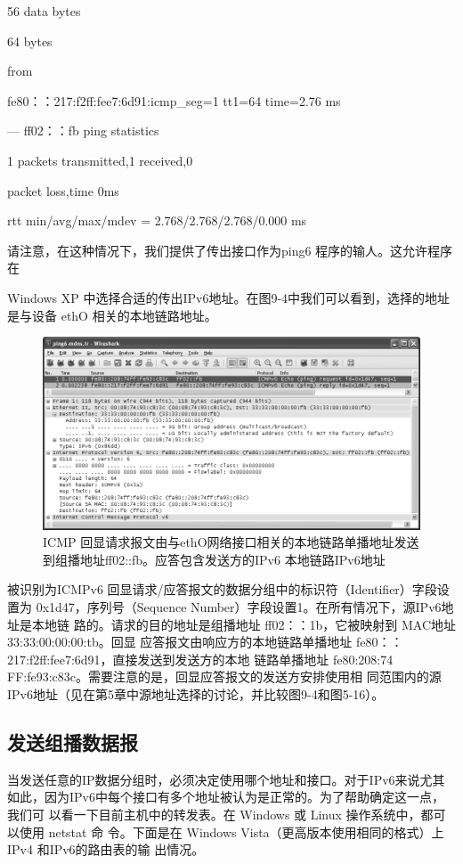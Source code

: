 56 data bytes

64 bytes

from

fe80：：217:f2ff:fee7:6d91:icmp\_seg=1 tt1=64 time=2.76 ms

--- ff02：：fb ping statistics

1 packets transmitted,1 received,0%

packet loss,time 0ms

rtt min/avg/max/mdev = 2.768/2.768/2.768/0.000 ms

请注意，在这种情况下，我们提供了传出接口作为ping6 程序的输人。这允许程序在

Windows XP 中选择合适的传出IPv6地址。在图9-4中我们可以看到，选择的地址是与设备
ethO 相关的本地链路地址。

\begin{figure}[ht]
    \centering
	\includegraphics[width=1\textwidth]{imgs/9/9-4.png}
	\caption{ICMP 回显请求报文由与ethO网络接口相关的本地链路单播地址发送到组播地址ff02::fb。应答包含发送方的IPv6 本地链路IPv6地址}
\end{figure}

被识别为ICMPv6 回显请求/应答报文的数据分组中的标识符（Identifier）字段设置为
0x1d47，序列号（Sequence Number）字段设置1。在所有情况下，源IPv6地址是本地链
路的。请求的目的地址是组播地址 ff02：：1b，它被映射到 MAC地址33:33:00:00:00:tb。回显
应答报文由响应方的本地链路单播地址 fe80：：217:f2ff:fee7:6d91，直接发送到发送方的本地
链路单播地址 fe80:208:74 FF:fe93:c83c。需要注意的是，回显应答报文的发送方安排使用相
同范围内的源 IPv6地址（见在第5章中源地址选择的讨论，并比较图9-4和图5-16）。

\subsection{发送组播数据报}
当发送任意的IP数据分组时，必须决定使用哪个地址和接口。对于IPv6来说尤其
如此，因为IPv6中每个接口有多个地址被认为是正常的。为了帮助确定这一点，我们可
以看一下目前主机中的转发表。在 Windows 或 Linux 操作系统中，都可以使用 netstat 命
令。下面是在 Windows Vista（更高版本使用相同的格式）上IPv4 和IPv6的路由表的输
出情况。

